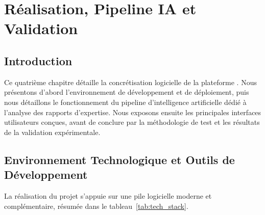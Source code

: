 
\chapter{Réalisation, Pipeline IA et Validation}
\label{chap:realisation}

\section{Introduction}

Ce quatrième chapitre détaille la concrétisation logicielle de la plateforme \textbf{\projectShortTitle}. Nous présentons d'abord l'environnement de développement et de déploiement, puis nous détaillons le fonctionnement du pipeline d'intelligence artificielle dédié à l'analyse des rapports d'expertise. Nous exposons ensuite les principales interfaces utilisateurs conçues, avant de conclure par la méthodologie de test et les résultats de la validation expérimentale.

\section{Environnement Technologique et Outils de Développement}

La réalisation du projet s'appuie sur une pile logicielle moderne et complémentaire, résumée dans le tableau~\ref{tab:tech_stack}.

